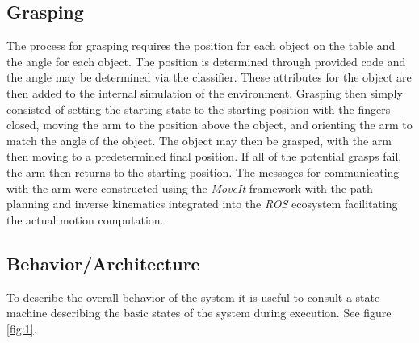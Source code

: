 \documentclass[letterpaper, 10 pt, conference]{conf/ieeeconf}  %
\begin{document}
\subsection{Grasping} %
The process for grasping requires the position for each object on the table and
the angle for each object. The position is determined through provided code and
the angle may be determined via the classifier. These attributes for the object
are then added to the internal simulation of the environment. Grasping then
simply consisted of setting the starting state to the starting position with the
fingers closed, moving the arm to the position above the object, and orienting
the arm to match the angle of the object. The object may then be grasped, with
the arm then moving to a predetermined final position. If all of the potential
grasps fail, the arm then returns to the starting position. The messages for
communicating with the arm were constructed using the \textit{MoveIt} framework
with the path planning and inverse kinematics integrated into the \textit{ROS}
ecosystem facilitating the actual motion computation.

\subsection{Behavior/Architecture} %
To describe the overall behavior of the system it is useful to consult a state
machine describing the basic states of the system during execution. See figure \ref{fig:1}.
\end{document}
